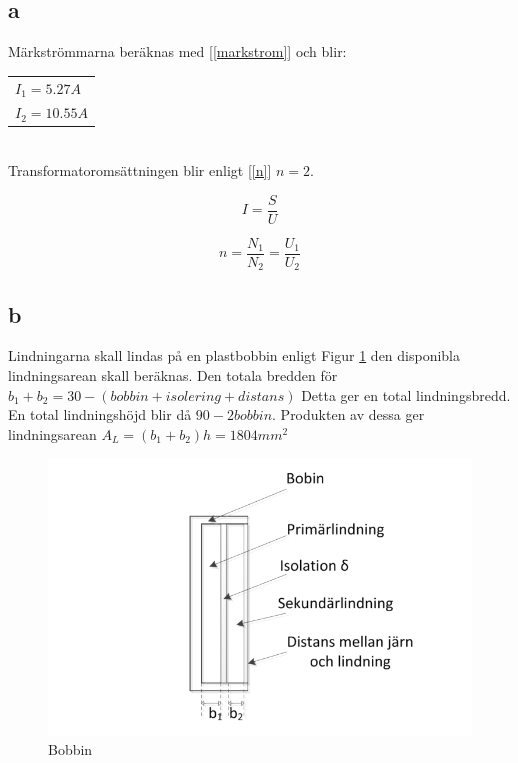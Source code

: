 \documentclass{article}
\begin{document}
\subsection{a}
Märkströmmarna beräknas med [\ref{markstrom}] och blir:
\begin{tabular}{|l}
  $I_1=5.27 A$\\
  $I_2=10.55 A$\\
\end{tabular}
\\
Transformatoromsättningen blir enligt [\ref{n}] $n=2$.

\begin{equation}
  I=\frac{S}{U}
  \label{markstrom}
\end{equation}

\begin{equation}
  n=\frac{N_1}{N_2}=\frac{U_1}{U_2}
  \label{n}
\end{equation}

\subsection{b}
Lindningarna skall lindas på en plastbobbin enligt Figur \ref{fig:bobbin} den disponibla lindningsarean skall beräknas.
Den totala bredden för $b_1+b_2=30-(bobbin+isolering+distans)$ Detta ger en total lindningsbredd.
En total lindningshöjd blir då $90-2bobbin$.
Produkten av dessa ger lindningsarean $A_L=(b_1+b_2)h=1804 mm^2$

 \begin{figure}[H]
 \begin{center}
 \includegraphics[width=1\textwidth]{img/bobbin.png} %
 \caption{Bobbin}
 \label{fig:bobbin}
 \end{center}
 \end{figure}
\end{document}
